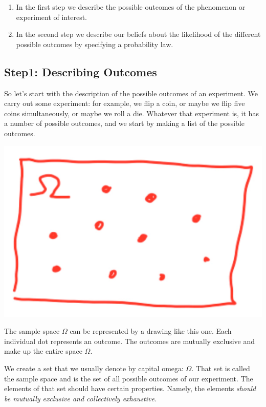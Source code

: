\documentclass{tufte-handout}
\begin{document}
\begin{enumerate}
\item In the first step we describe the possible outcomes of the phenomenon or
experiment of interest.
\item In the second step we describe our beliefs about the likelihood of the different
possible outcomes by specifying a probability law.
\end{enumerate}


\subsection{Step1: Describing Outcomes}\label{sec:outcomes}

So let's start with the description of the possible outcomes of
an experiment. We carry out some experiment: for example, we flip a coin, or maybe we flip five coins
simultaneously, or maybe we roll a die. Whatever that experiment is, it has a number of possible
outcomes, and we start by making a list of the possible outcomes.


\begin{marginfigure}
  \includegraphics[width=\linewidth]{Omega}
  \caption{The sample space $\Omega$ can be represented by a  drawing like this one. Each individual dot represents an outcome. The outcomes are mutually exclusive and make up the entire space $\Omega$.}
  \label{fig:marginfig}
\end{marginfigure}

We create a set that we usually denote by capital omega: $\Omega$. That set is called the sample 
space and is the set of all possible outcomes of our experiment. 
The elements of that set should have certain properties. Namely, the elements \textit{should be 
mutually exclusive and collectively exhaustive.}
\end{document}
